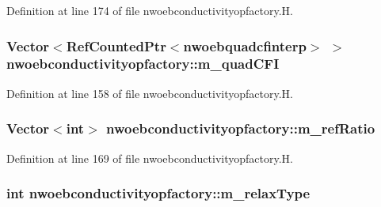 Definition at line 174 of file nwoebconductivityopfactory.\+H.

\subsubsection[{\texorpdfstring{m\+\_\+quad\+C\+FI}{m_quadCFI}}]{\setlength{\rightskip}{0pt plus 5cm}Vector$<$Ref\+Counted\+Ptr$<${\bf nwoebquadcfinterp}$>$ $>$ nwoebconductivityopfactory\+::m\+\_\+quad\+C\+FI\hspace{0.3cm}{\ttfamily [protected]}}\hypertarget{classnwoebconductivityopfactory_a4837043fab49fb84922e908d48be775b}{}\label{classnwoebconductivityopfactory_a4837043fab49fb84922e908d48be775b}


Definition at line 158 of file nwoebconductivityopfactory.\+H.

\subsubsection[{\texorpdfstring{m\+\_\+ref\+Ratio}{m_refRatio}}]{\setlength{\rightskip}{0pt plus 5cm}Vector$<$int$>$ nwoebconductivityopfactory\+::m\+\_\+ref\+Ratio\hspace{0.3cm}{\ttfamily [protected]}}\hypertarget{classnwoebconductivityopfactory_ab6b52246db7083497333dce7ee505ddb}{}\label{classnwoebconductivityopfactory_ab6b52246db7083497333dce7ee505ddb}


Definition at line 169 of file nwoebconductivityopfactory.\+H.

\subsubsection[{\texorpdfstring{m\+\_\+relax\+Type}{m_relaxType}}]{\setlength{\rightskip}{0pt plus 5cm}int nwoebconductivityopfactory\+::m\+\_\+relax\+Type\hspace{0.3cm}{\ttfamily [protected]}}\hypertarget{classnwoebconductivityopfactory_a8c6d398c78dc50f3713a9bbb24c93bc4}{}\label{classnwoebconductivityopfactory_a8c6d398c78dc50f3713a9bbb24c93bc4}


